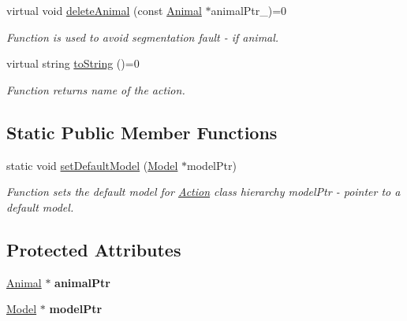 \begin{DoxyCompactItemize}
virtual void \hyperlink{class_action_a3e44b723755059935ee658ac1472ee9e}{delete\+Animal} (const \hyperlink{class_animal}{Animal} $\ast$animal\+Ptr\+\_\+)=0
\begin{DoxyCompactList}\small\item\em Function is used to avoid segmentation fault -\/ if animal. \end{DoxyCompactList}\item 
virtual string \hyperlink{class_action_a752a31c122f369e92c3e09cdc1a6d617}{to\+String} ()=0
\begin{DoxyCompactList}\small\item\em Function returns name of the action. \end{DoxyCompactList}\end{DoxyCompactItemize}
\subsection*{Static Public Member Functions}
\begin{DoxyCompactItemize}
\item 
static void \hyperlink{class_action_a1561b27a20176b1f32ca6f2d5dd94869}{set\+Default\+Model} (\hyperlink{class_model}{Model} $\ast$model\+Ptr)
\begin{DoxyCompactList}\small\item\em Function sets the default model for \hyperlink{class_action}{Action} class hierarchy  model\+Ptr -\/ pointer to a default model. \end{DoxyCompactList}\end{DoxyCompactItemize}
\subsection*{Protected Attributes}
\begin{DoxyCompactItemize}
\item 
\hypertarget{class_action_a37711c4920bfbf5ccf7a82e6165e6cf2}{}\hyperlink{class_animal}{Animal} $\ast$ {\bfseries animal\+Ptr}\label{class_action_a37711c4920bfbf5ccf7a82e6165e6cf2}

\item 
\hypertarget{class_action_a451d89d07a4cfe44be1fc52490907139}{}\hyperlink{class_model}{Model} $\ast$ {\bfseries model\+Ptr}\label{class_action_a451d89d07a4cfe44be1fc52490907139}

\end{DoxyCompactItemize}
